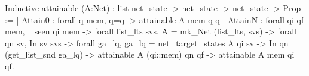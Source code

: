 Inductive attainable (A:Net) : 
              list net_state -> net_state -> net_state -> Prop :=
  | Attain0 : forall q mem, q=q -> attainable A mem q q
  | AttainN : forall qi qf mem,  ~ seen qi mem ->
              forall list_lts svs, A = mk_Net (list_lts, svs) ->
              forall qn sv, In sv svs ->
              forall ga_lq, ga_lq = net_target_states A qi sv -> 
              In qn (get_list_snd ga_lq) ->
              attainable A (qi::mem) qn qf ->
              attainable A mem qi qf.